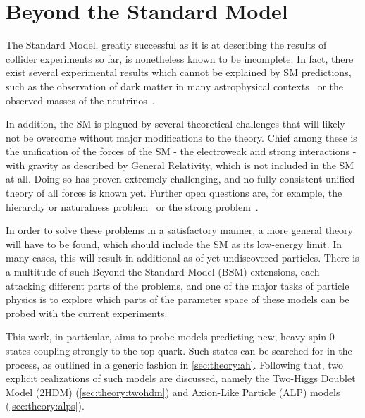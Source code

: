 

\section{Beyond the Standard Model}
\label{sec:theory:bsm}

The Standard Model, greatly successful as it is at describing the results of collider experiments so far, is nonetheless known to be incomplete. In fact, there exist several experimental results which cannot be explained by SM predictions, such as the observation of dark matter in many astrophysical contexts~\cite{Bertone:2004pz,Porter:2011nv,Arbey:2021gdg} or the observed masses of the neutrinos~\cite{deGouvea:2016qpx,Dev:2023iyn}. 

In addition, the SM is plagued by several theoretical challenges that will likely not be overcome without major modifications to the theory. Chief among these is the unification of the forces of the SM - the electroweak and strong interactions - with gravity as described by General Relativity, which is not included in the SM at all. Doing so has proven extremely challenging, and no fully consistent unified theory of all forces is known yet. Further open questions are, for example, the hierarchy or naturalness problem~\cite{Nelson:1985,Koren:2020pio,Craig:2022eqo} or the strong \CP problem~\cite{Peccei:1977hh,Peccei:1977ur}.

In order to solve these problems in a satisfactory manner, a more general theory will have to be found, which should include the SM as its low-energy limit. In many cases, this will result in additional as of yet undiscovered particles. There is a multitude of such Beyond the Standard Model (BSM) extensions, each attacking different parts of the problems, and one of the major tasks of particle physics is to explore which parts of the parameter space of these models can be probed with the current experiments.

This work, in particular, aims to probe models predicting new, heavy spin-0 states coupling strongly to the top quark. Such states can be searched for in the \pptt process, as outlined in a generic fashion in \cref{sec:theory:ah}. Following that, two explicit realizations of such models are discussed, namely the Two-Higgs Doublet Model (2HDM) (\cref{sec:theory:twohdm}) and Axion-Like Particle (ALP) models (\cref{sec:theory:alps}).


